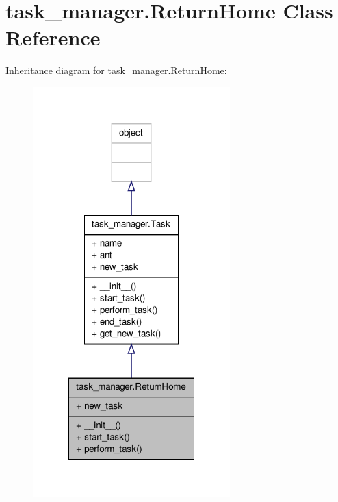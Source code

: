 \hypertarget{classtask__manager_1_1ReturnHome}{\section{task\+\_\+manager.\+Return\+Home Class Reference}
\label{classtask__manager_1_1ReturnHome}
}


Inheritance diagram for task\+\_\+manager.\+Return\+Home\+:
\nopagebreak
\begin{figure}[H]
\begin{center}
\leavevmode
\includegraphics[width=216pt]{classtask__manager_1_1ReturnHome__inherit__graph}
\end{center}
\end{figure}


